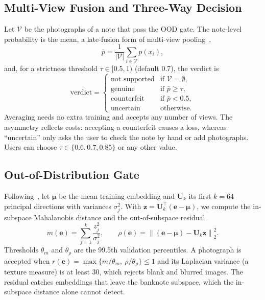 \documentclass[journal]{IEEEtran}
\begin{document}
\subsection{Multi-View Fusion and Three-Way Decision}
\label{sec:decision}
Let $\mathcal{V}$ be the photographs of a note that pass the OOD gate. The note-level
probability is the mean, a late-fusion form of multi-view pooling~\cite{su2015mvcnn},
\begin{equation}
\bar{p} = \frac{1}{|\mathcal{V}|}\sum_{i\in\mathcal{V}} p(x_i),
\label{eq:fusion}
\end{equation}
and, for a strictness threshold $\tau\in[0.5,1)$ (default 0.7), the verdict is
\begin{equation}
\text{verdict} =
\begin{cases}
\text{not supported} & \text{if } \mathcal{V}=\emptyset,\\
\text{genuine} & \text{if } \bar{p}\ge\tau,\\
\text{counterfeit} & \text{if } \bar{p}<0.5,\\
\text{uncertain} & \text{otherwise.}
\end{cases}
\label{eq:decision}
\end{equation}
Averaging needs no extra training and accepts any number of views. The asymmetry
reflects costs: accepting a counterfeit causes a loss, whereas ``uncertain'' only asks
the user to check the note by hand or add photographs. Users can choose
$\tau\in\{0.6,0.7,0.85\}$ or any other value.

\subsection{Out-of-Distribution Gate}
\label{sec:ood}
Following~\cite{lee2018mahalanobis}, let $\boldsymbol{\mu}$ be the mean training
embedding and $\mathbf{U}_k$ its first $k=64$ principal directions with variances
$\sigma_j^2$. With $\mathbf{z}=\mathbf{U}_k^{\top}(\mathbf{e}-\boldsymbol{\mu})$, we
compute the in-subspace Mahalanobis distance and the out-of-subspace residual
\begin{equation}
m(\mathbf{e}) = \sum_{j=1}^{k}\frac{z_j^2}{\sigma_j^2},\qquad
\rho(\mathbf{e}) = \left\lVert(\mathbf{e}-\boldsymbol{\mu})-\mathbf{U}_k\mathbf{z}\right\rVert_2^2 .
\label{eq:ood}
\end{equation}
Thresholds $\theta_m$ and $\theta_\rho$ are the 99.5th validation percentiles. A
photograph is accepted when
$r(\mathbf{e})=\max\{m/\theta_m,\ \rho/\theta_\rho\}\le1$ and its Laplacian variance (a
texture measure) is at least 30, which rejects blank and blurred images. The residual
catches embeddings that leave the banknote subspace, which the in-subspace distance
alone cannot detect.
\end{document}
